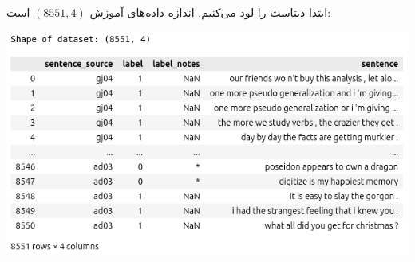 \begin{qsolve}
	ابتدا دیتاست را لود می‌کنیم. اندازه داده‌های آموزش $(8551, 4)$ است:
	
	\begin{center}
		\includegraphics*[width=0.9\linewidth]{pics/img11.png}
		\label{داده‌های آموزش دومین}
	\end{center}	
\end{qsolve}


